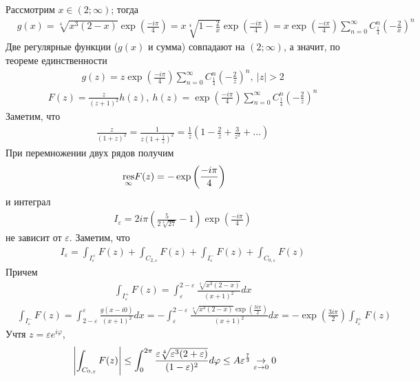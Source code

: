Рассмотрим $x \in (2; \infty)$; тогда
\begin{align*}
  & g(x) = \sqrt[4]{x^3(2-x)}\exp\left( \frac{-i\pi}{4} \right) = x\sqrt[4]{1-\frac{2}{x}}\exp \left( \frac{-i\pi}{4} \right) = x\exp\left( \frac{-i\pi}{4} \right)\sum_{n=0}^\infty C_{\frac{1}{4}}^n\left( -\frac{2}{x} \right)^n
\end{align*}
Две регулярные функции ($g(x)$ и сумма) совпадают на $(2; \infty)$, а значит, по
теореме единственности
\begin{align*}
  & g(z) = z\exp\left( \frac{-i\pi}{4} \right)\sum_{n=0}^\infty C_{\frac{1}{4}}^n\left( -\frac{2}{z} \right)^n, \ \left| z \right|> 2
\end{align*}
\begin{align*}
  & F(z) = \frac{z}{(z+1)^2}h(z), \ h(z) = \exp\left( \frac{-i\pi}{4} \right)\sum_{n=0}^\infty C_{\frac{1}{4}}^n\left( -\frac{2}{z} \right)^n
\end{align*}
Заметим, что
\begin{align*}
  & \frac{z}{(1+z)^2} = \frac{1}{z(1+\frac{1}{z})^2} = \frac{1}{z} \left( 1-\frac{2}{z} +\frac{3}{z^2} + \dots \right)
\end{align*}
При перемножении двух рядов получим
\begin{align*}
  & \underset{\infty}{\mathrm{res}}F(z) = -\exp\left( \frac{-i\pi}{4} \right)
\end{align*}
и интеграл
\begin{align*}
  & I_\varepsilon = 2 i \pi \left( \frac{5}{2\sqrt[4]{27}} - 1 \right)\exp\left( \frac{-i\pi}{4} \right)
\end{align*}
не зависит от $\varepsilon$. Заметим, что
\begin{align*}
  & I_\varepsilon = \int_{I_\varepsilon^+}F(z) + \int_{C_{2, \varepsilon}}F(z) + \int_{I_\varepsilon^-}F(z) + \int_{C_{0, \varepsilon}}F(z)
\end{align*}
Причем
\begin{align*}
  & \int_{I_\varepsilon^+}F(z) = \int_{\varepsilon}^{2-\varepsilon}\frac{\sqrt[4]{x^3(2-x)}}{(x+1)^2}dx
\end{align*}
\begin{align*}
  & \int_{I_\varepsilon^-}F(z) = \int_{2-\varepsilon}^{\varepsilon}\frac{g(x-i0)}{(x+1)^2}dx = -\int_{\varepsilon}^{2-\varepsilon}\frac{\sqrt[4]{x^3(2-x)}\exp\left( \frac{3i\pi}{2} \right)}{(x+1)^2}dx = -\exp\left( \frac{3i\pi}{2}\right) \int_{I_\varepsilon^+}F(z)
\end{align*}
Учтя $z = \varepsilon e^{i \varphi}$,
\begin{align*}
  & \left|  \int_{C_{0, \varepsilon}}F(z) \right| \leq \int_{0}^{2 \pi}\frac{\varepsilon\sqrt[4]{\varepsilon^3(2+\varepsilon)}}{(1-\varepsilon)^2}d\varphi \leq A\varepsilon^{\frac{7}{3}} \underset{\varepsilon \to 0}{\to} 0
\end{align*}
